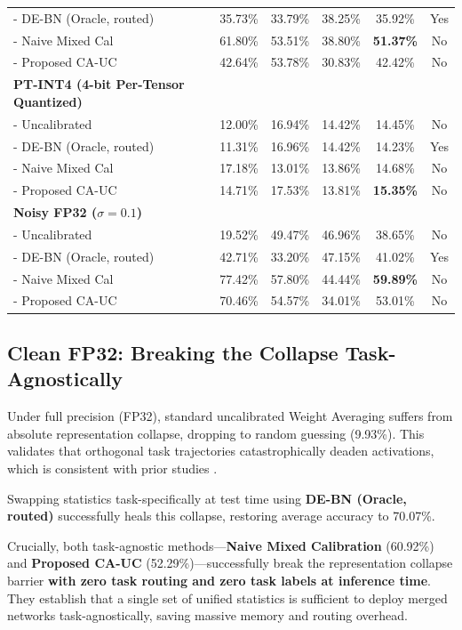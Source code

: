 \documentclass{article}
\theoremstyle{plain}
\theoremstyle{definition}
\theoremstyle{remark}
\begin{document}
\begin{table}[t]
\begin{center}
\begin{footnotesize}
\begin{tabular}{lccccc}
- DE-BN (Oracle, routed) & 35.73\% & 33.79\% & 38.25\% & 35.92\% & Yes \\
- Naive Mixed Cal & 61.80\% & 53.51\% & 38.80\% & \textbf{51.37\%} & No \\
- Proposed CA-UC & 42.64\% & 53.78\% & 30.83\% & 42.42\% & No \\
\midrule
\textbf{PT-INT4 (4-bit Per-Tensor Quantized)} & & & & & \\
- Uncalibrated & 12.00\% & 16.94\% & 14.42\% & 14.45\% & No \\
- DE-BN (Oracle, routed) & 11.31\% & 16.96\% & 14.42\% & 14.23\% & Yes \\
- Naive Mixed Cal & 17.18\% & 13.01\% & 13.86\% & 14.68\% & No \\
- Proposed CA-UC & 14.71\% & 17.53\% & 13.81\% & \textbf{15.35\%} & No \\
\midrule
\textbf{Noisy FP32 ($\sigma = 0.1$)} & & & & & \\
- Uncalibrated & 19.52\% & 49.47\% & 46.96\% & 38.65\% & No \\
- DE-BN (Oracle, routed) & 42.71\% & 33.20\% & 47.15\% & 41.02\% & Yes \\
- Naive Mixed Cal & 77.42\% & 57.80\% & 44.44\% & \textbf{59.89\%} & No \\
- Proposed CA-UC & 70.46\% & 54.57\% & 34.01\% & 53.01\% & No \\
\bottomrule
\end{tabular}
\end{footnotesize}
\end{center}
\vskip -0.1in
\end{table}

\subsection{Clean FP32: Breaking the Collapse Task-Agnostically}
Under full precision (FP32), standard uncalibrated Weight Averaging suffers from absolute representation collapse, dropping to random guessing (9.93\%). This validates that orthogonal task trajectories catastrophically deaden activations, which is consistent with prior studies \cite{Jordan2023Repair, Leclaire2024Ipr}.

Swapping statistics task-specifically at test time using \textbf{DE-BN (Oracle, routed)} successfully heals this collapse, restoring average accuracy to 70.07\%. 

Crucially, both task-agnostic methods---\textbf{Naive Mixed Calibration} (60.92\%) and \textbf{Proposed CA-UC} (52.29\%)---successfully break the representation collapse barrier \textbf{with zero task routing and zero task labels at inference time}. They establish that a single set of unified statistics is sufficient to deploy merged networks task-agnostically, saving massive memory and routing overhead.
\end{document}

